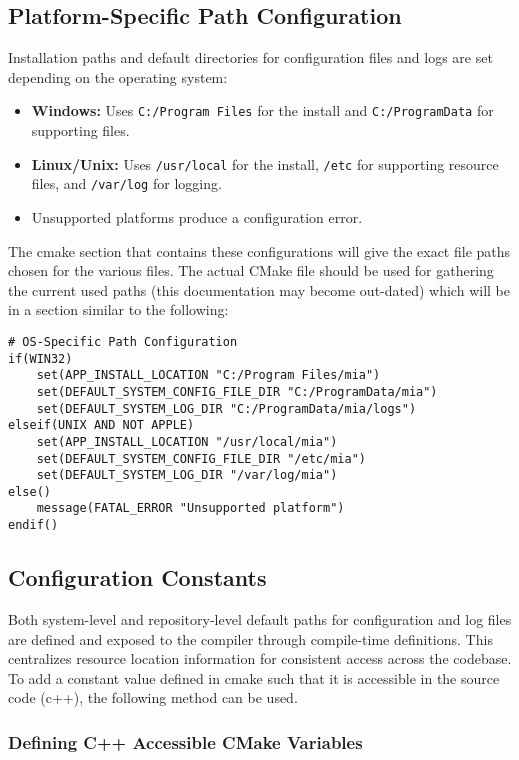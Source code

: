 \subsection{Platform-Specific Path Configuration}

Installation paths and default directories for configuration files and logs are set depending on the operating system:
\begin{itemize}
	\item \textbf{Windows:} Uses \texttt{C:/Program Files} for the install and \texttt{C:/ProgramData} for supporting files.
	\item \textbf{Linux/Unix:} Uses \texttt{/usr/local} for the install, \texttt{/etc} for supporting resource files, and \texttt{/var/log} for logging.
	\item Unsupported platforms produce a configuration error.
\end{itemize}
The cmake section that contains these configurations will give the exact file paths chosen for the various files. The actual CMake file should be used for gathering the current used paths (this documentation may become out-dated) which will be in a section similar to the following:
\begin{lstlisting}[style=shellstyle]
# OS-Specific Path Configuration
if(WIN32)
    set(APP_INSTALL_LOCATION "C:/Program Files/mia")
    set(DEFAULT_SYSTEM_CONFIG_FILE_DIR "C:/ProgramData/mia")
    set(DEFAULT_SYSTEM_LOG_DIR "C:/ProgramData/mia/logs")
elseif(UNIX AND NOT APPLE)
    set(APP_INSTALL_LOCATION "/usr/local/mia")
    set(DEFAULT_SYSTEM_CONFIG_FILE_DIR "/etc/mia")
    set(DEFAULT_SYSTEM_LOG_DIR "/var/log/mia")
else()
    message(FATAL_ERROR "Unsupported platform")
endif()
\end{lstlisting}

\subsection{Configuration Constants}

Both system-level and repository-level default paths for configuration and log files are defined and exposed to the compiler through compile-time definitions. This centralizes resource location information for consistent access across the codebase. To add a constant value defined in cmake such that it is accessible in the source code (c++), the following method can be used.

\subsubsection{Defining C++ Accessible CMake Variables}

